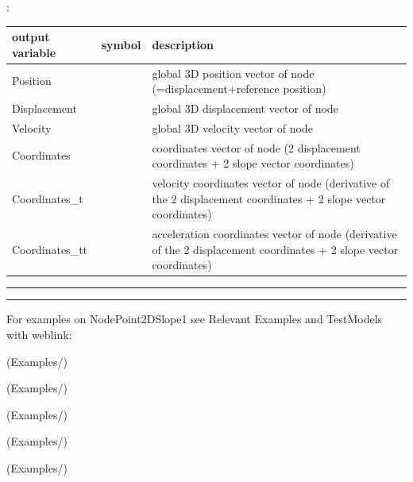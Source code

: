 :
\begin{center}
\footnotesize
\begin{longtable}{| p{5cm} | p{5cm} | p{6cm} |} 
\hline
\bf output variable & \bf symbol & \bf description \\ \hline
Position &  & global 3D position vector of node (=displacement+reference position)\\ \hline
Displacement &  & global 3D displacement vector of node\\ \hline
Velocity &  & global 3D velocity vector of node\\ \hline
Coordinates &  & coordinates vector of node (2 displacement coordinates + 2 slope vector coordinates)\\ \hline
Coordinates\_t &  & velocity coordinates vector of node (derivative of the 2 displacement coordinates + 2 slope vector coordinates)\\ \hline
Coordinates\_tt &  & acceleration coordinates vector of node (derivative of the 2 displacement coordinates + 2 slope vector coordinates)\\ \hline
\end{longtable}
\end{center}
\par\noindent\rule{\textwidth}{0.4pt}
\label{description_NodePoint2DSlope1}
\vspace{6pt}\par\noindent\rule{\textwidth}{0.4pt}
%
\noindent For examples on NodePoint2DSlope1 see Relevant Examples and TestModels with weblink:
\bi
\item {} (Examples/)
\item {} (Examples/)
\item {} (Examples/)
\item {} (Examples/)
\item {} (Examples/)
